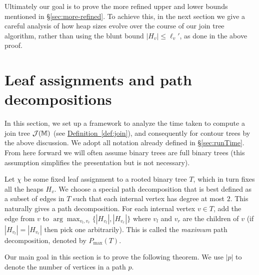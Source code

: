 \documentclass[11pt]{article}
\theoremstyle{definition}
\newcommand{\cJ}{{\cal J}}
\newcommand{\MM}{\mathbb{M}}
\newcommand{\Sec}[1]{\hyperref[sec:#1]{\S\ref*{sec:#1}}} %
\newcommand{\Def}[1]{\hyperref[def:#1]{Definition~\ref*{def:#1}}} %
\newcommand{\pmax}{P_{\max}}
\begin{document}
Ultimately our goal is to prove the more refined upper and lower bounds mentioned in \Sec{more-refined}.  
To achieve this, in the next section we give a careful analysis of how heap sizes evolve over the course of our join tree algorithm, 
rather than using the blunt bound $|H_v|\leq \ell_v'$, as done in the above proof. 



\section{Leaf assignments and path decompositions}
\label{sec:pathDecomp}

In this section, we set up a framework to analyze the time taken to compute a join tree $\cJ(\MM)$ (see \Def{join}), and consequently for contour trees by the above discussion.
We adopt all notation already defined in \Sec{runTime}.  From here forward we will often assume binary trees are full binary trees 
(this assumption simplifies the presentation but is not necessary).

Let $\chi$ be some fixed leaf assignment to a rooted binary tree $T$, which in turn fixes all the heaps $H_v$. 
We choose a special path decomposition that is best defined as a subset of edges in $T$ such that each internal
vertex has degree at most $2$. This naturally gives a path decomposition.
For each internal vertex $v\in T$, add the edge from $v$ to $\arg \max_{v_l, v_r} \{|H_{v_l}|, |H_{v_r}|\}$ 
 where $v_l$ and $v_r$ are the children of $v$ (if $|H_{v_l}|=|H_{v_r}|$ then pick one arbitrarily).
This is called the \emph{maximum} path decomposition, denoted by $\pmax(T)$.

Our main goal in this section is to prove the following theorem.  We use $|p|$ to denote the number of vertices in a path $p$.
\end{document}
